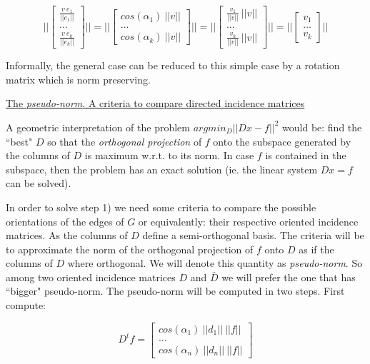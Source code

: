 \documentclass[a4paper,11pt]{article}
\begin{document}
$$
||\begin{bmatrix}
	\frac{v \ e_1}{||e_1||} \\
	\dots \\
	\frac{v \ e_k}{||e_k||}
\end{bmatrix}|| = 
||\begin{bmatrix}
	cos(\alpha_1) \ ||v|| \\
	\dots \\
	cos(\alpha_k) \ ||v||
\end{bmatrix}|| = 
||\begin{bmatrix}
	\frac{v_1}{||v||} \ ||v|| \\
	\dots \\
	\frac{v_k}{||v||} \ ||v||
\end{bmatrix}|| = 
||\begin{bmatrix}
	v_1 \\
	\dots \\
	v_k
\end{bmatrix}||
$$

\bigskip

Informally, the general case can be reduced to this simple case by a 
rotation matrix which is norm preserving.

\bigskip

\underline{The \textit{pseudo-norm}. A criteria to compare directed incidence matrices}

\bigskip

A geometric interpretation of the problem $argmin_D||Dx-f||^2$ would be: 
find the ``best" $D$ so that the \textit{orthogonal projection} of $f$ 
onto the subspace generated by the columns of $D$ is 
maximum w.r.t. to its norm. In case $f$ is contained in the subspace, 
then the problem has an exact solution (ie. the linear system $Dx = f$ 
can be solved).

\bigskip

In order to solve step 1) we need some criteria to compare the possible 
orientations of the edges of $G$ or equivalently: their respective 
oriented incidence matrices. As the columns of $D$ define a 
semi-orthogonal basis. The criteria will be to approximate the norm 
of the orthogonal projection of $f$ onto $D$ as if the columns of $D$ 
where orthogonal. We will denote this quantity as \textit{pseudo-norm}.
 So among two oriented incidence matrices $D$ and $\bar{D}$ we will 
prefer the one that has ``bigger" pseudo-norm. The pseudo-norm will be 
computed in two steps. First compute:

$$
D^t f = \begin{bmatrix}
	cos(\alpha_1) \ ||d_1|| \ ||f||\\
	\dots \\
	cos(\alpha_n) \ ||d_n|| \ ||f||
\end{bmatrix}
$$
\end{document}
